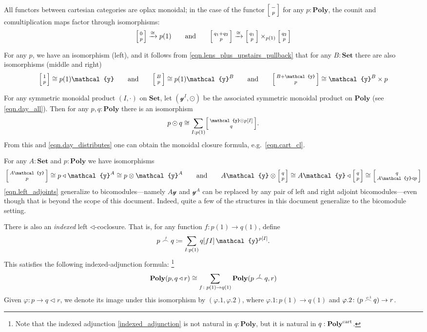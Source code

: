 \documentclass[11pt, one side, article]{memoir}
\makeatletter
\theoremstyle{definition}
\theoremstyle{plain}
\newcommand{\Cat}[1]{\mathbf{#1}}%
\newcommand{\To}[2][]{\xrightarrow[#1]{\tn{$#2$}}}
\newcommand{\tn}[1]{\textnormal{#1}}
\newcommand{\smset}{\Cat{Set}}
\newcommand{\yon}{{\mathcal{y}}}
\newcommand{\poly}{\Cat{Poly}}
\newcommand{\cart}{\tn{cart}}
\newcommand{\polycart}{\poly^\cart}
\newcommand{\0}{\textsf{0}}
\newcommand{\1}{\tn{\textsf{1}}}
\newcommand{\tri}{\mathbin{\triangleleft}}
\newcommand{\biglens}[2]{
     \begin{bmatrix}{\vphantom{f_f^f}#2} \\ {\vphantom{f_f^f}#1} \end{bmatrix}
}
\newcommand{\littlelens}[2]{
     \begin{bsmallmatrix}{\vphantom{f}#2} \\ {\vphantom{f}#1} \end{bsmallmatrix}
}
\newcommand{\lens}[2]{
  \relax\if@display
     \biglens{#1}{#2}
  \else
     \littlelens{#1}{#2}
  \fi
}
\newcommand{\indexcoclscale}[1]{\scalebox{.7}{#1}}
\newcommand{\cocl}[1]{
	\scriptsize\overset{\,\indexcoclscale{$#1$}}{\frown}\normalsize
}
\newcommand{\hh}[2][]{#1 \tn{#2} #1}
\newcommand{\qqand}{\hh[\qquad]{and}}
\makeatother
\begin{document}
All functors between cartesian categories are oplax monoidal; in the case of the functor $\lens{p}{-}$ for any $p:\poly$, the counit and comultiplication maps factor through isomorphisms:
\begin{equation}\label{eqn.lens_plus_upstairs_pullback}
	\lens{p}{0}\To{\cong}p(1)
	\qqand
	\lens{p}{q_1+q_2}\To{\cong}\lens{p}{q_1}\times_{p(1)}\lens{p}{q_2}
\end{equation}

For any $p$, we have an isomorphism (left), and it follows from \eqref{eqn.lens_plus_upstairs_pullback} that for any $B:\smset$ there are also isomorphisms (middle and right)
\begin{equation}
  \lens{p}{1}\cong p(1)\yon
  \qqand
  \lens{p}{B}\cong p(1)\yon^B
  \qqand
  \lens{p}{B+\yon}\cong\yon^B\times p
\end{equation}

For any symmetric monoidal product $(I,\cdot)$ on $\smset$, let $(\yon^I,\odot)$ be the associated symmetric monoidal product on $\poly$ (see \cref{eqn.day_all}). Then for any $p,q:\poly$ there is an isomorphism
\begin{equation}
	p\odot q\cong\sum_{I:p(1)}\lens{q}{\yon\odot p[I]}.
\end{equation}
From this and \eqref{eqn.day_distributes} one can obtain the monoidal closure formula, e.g.\ \eqref{eqn.cart_cl}.


For any $A:\smset$ and $p:\poly$ we have isomorphisms
\begin{equation}\label{eqn.left_adjoints}
  \lens{p}{A\yon}\cong 
  p\tri\yon^A\cong 
  p\otimes\yon^A
  \qqand
  A\yon\otimes\lens{p}{q}\cong
  A\yon\tri\lens{p}{q}\cong
	\lens{A\yon\tri p}{q}
\end{equation}
\cref{eqn.left_adjoints} generalize to bicomodules---namely $A\yon$ and $\yon^A$ can be replaced by any pair of left and right adjoint bicomodules---even though that is beyond the scope of this document. Indeed, quite a few of the structures in this document generalize to the bicomodule setting.

There is also an \emph{indexed} left $\tri$-coclosure. That is, for any function $f\colon p(1)\to q(1)$, define
\begin{equation}
	p\cocl{f}q\coloneqq \sum_{I: p(1)}q[fI]\,\yon^{p[I]}.
\end{equation}
This satisfies the following indexed-adjunction formula:%
\footnote{Note that the indexed adjunction \eqref{indexed_adjunction} is not natural in $q:\poly$, but it is natural in $q:\polycart$.}
\begin{equation}\label{indexed_adjunction}
	\poly(p,q\tri r)\cong\sum_{f\colon p(1)\to q(1)}\poly(p\cocl{f}q,r)
\end{equation}
Given $\varphi\colon p\to q\tri r$, we denote its image under this isomorphism by $(\varphi.1,\varphi.2)$, where $\varphi.1\colon p(1)\to q(1)$ and $\varphi.2\colon (p\cocl{\varphi.1}q)\to r$.
\end{document}

